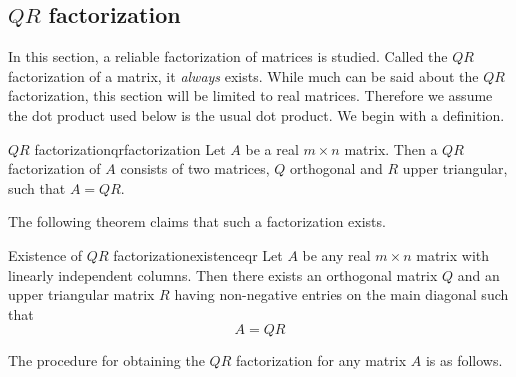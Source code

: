 \subsection{$QR$ factorization}

In this section, a reliable factorization of matrices is studied. Called the $QR$ factorization of a matrix, it \textit{always} exists. While much can be said about the $QR$ factorization, this section will be limited to real matrices. Therefore we assume the dot product used below is the usual dot product. We begin with a definition. 

\begin{definition}{$QR$ factorization}{qrfactorization}
Let $A$ be a real $m\times n$ matrix. Then a $QR$ factorization of $A$ consists
of two matrices, $Q$ orthogonal and $R$ upper
triangular, such that $A=QR.$ 
\end{definition}

The following theorem claims that such a factorization exists. 

\begin{theorem}{Existence of $QR$ factorization}{existenceqr}
Let $A$ be any real $m\times n$ matrix with linearly independent columns. Then there exists an orthogonal
matrix $Q$ and an upper triangular matrix $R$ having non-negative entries
on the main diagonal such that
\begin{equation*}
A=QR
\end{equation*}
\end{theorem}

The procedure for obtaining the $QR$ factorization for any matrix $A$ is as follows.

